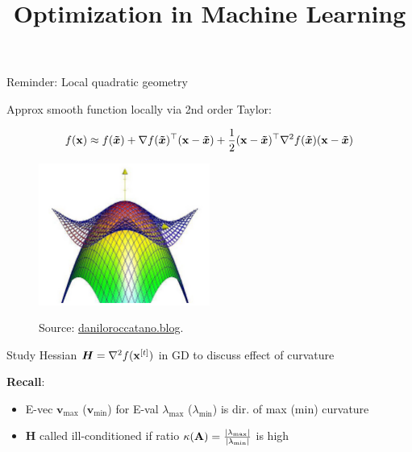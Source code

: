 \documentclass[11pt,compress,t,notes=noshow, xcolor=table]{beamer}
\title{Optimization in Machine Learning}
\date{}
\begin{document}
\sloppy

\begin{vbframe}{Reminder: Local quadratic geometry}

Approx smooth function locally via 2nd order Taylor:

\vspace*{-0.3cm}

$$
f(\mathbf{x}) \approx f(\bm{\tilde{x}}) + \nabla f(\bm{\tilde{x}})^\top(\mathbf{x}-\bm{\tilde{x}}) +
\frac 12(\mathbf{x}-\bm{\tilde{x}})^\top\nabla^2 f(\bm{\tilde{x}})(\mathbf{x}-\bm{\tilde{x}})
$$

\begin{figure}
	\includegraphics[width=0.5\textwidth]{figure_man/taylor_2D_quadratic.png} \\
	\begin{footnotesize} 
 Source: \url{daniloroccatano.blog}.
	\end{footnotesize}
\end{figure}

\framebreak 



Study Hessian $\bm{H} = \nabla^2 f(\mathbf{x}^{[t]})$ in GD to discuss effect of curvature 

\vspace{0.2cm} 

\textbf{Recall}:
\begin{itemize}
	\item E-vec $\textbf{v}_\text{max}$ ($\textbf{v}_\text{min}$) for E-val $\lambda_\text{max}$ ($\lambda_\text{min}$) is dir. of max (min) curvature
	\item $\bm{H}$ called ill-conditioned if ratio $\kappa(\mathbf{A}) = \frac{|\lambda_\text{max}|}{|\lambda_\text{min}|}$ is high
\end{itemize}


\end{vbframe}
\end{document}
